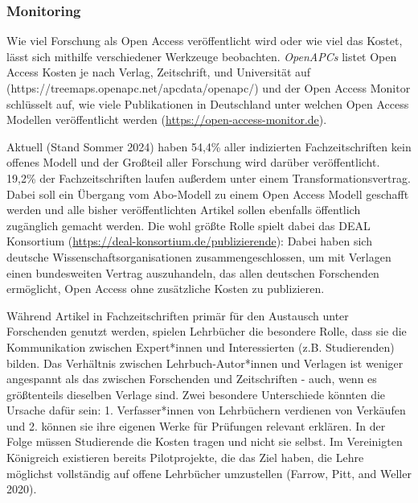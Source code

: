 \documentclass[
  letterpaper,
  DIV=11,
  numbers=noendperiod]{scrreprt}
\begin{document}
\subsubsection{Monitoring}\label{monitoring}

Wie viel Forschung als Open Access veröffentlicht wird oder wie viel das
Kostet, lässt sich mithilfe verschiedener Werkzeuge beobachten.
\emph{OpenAPCs} listet Open Access Kosten je nach Verlag, Zeitschrift,
und Universität auf (https://treemaps.openapc.net/apcdata/openapc/) und
der Open Access Monitor schlüsselt auf, wie viele Publikationen in
Deutschland unter welchen Open Access Modellen veröffentlicht werden
(\url{https://open-access-monitor.de}).

Aktuell (Stand Sommer 2024) haben 54,4\% aller indizierten
Fachzeitschriften kein offenes Modell und der Großteil aller Forschung
wird darüber veröffentlicht. 19,2\% der Fachzeitschriften laufen
außerdem unter einem Transformationsvertrag. Dabei soll ein Übergang vom
Abo-Modell zu einem Open Access Modell geschafft werden und alle bisher
veröffentlichten Artikel sollen ebenfalls öffentlich zugänglich gemacht
werden. Die wohl größte Rolle spielt dabei das DEAL Konsortium
(\url{https://deal-konsortium.de/publizierende}): Dabei haben sich
deutsche Wissenschaftsorganisationen zusammengeschlossen, um mit
Verlagen einen bundesweiten Vertrag auszuhandeln, das allen deutschen
Forschenden ermöglicht, Open Access ohne zusätzliche Kosten zu
publizieren.

\begin{tcolorbox}[enhanced jigsaw, left=2mm, colback=white, colframe=quarto-callout-note-color-frame, opacitybacktitle=0.6, opacityback=0, title=\textcolor{quarto-callout-note-color}{\faInfo}\hspace{0.5em}{Offene Lehrbücher}, toptitle=1mm, coltitle=black, colbacktitle=quarto-callout-note-color!10!white, titlerule=0mm, bottomtitle=1mm, leftrule=.75mm, breakable, rightrule=.15mm, bottomrule=.15mm, toprule=.15mm, arc=.35mm]

Während Artikel in Fachzeitschriften primär für den Austausch unter
Forschenden genutzt werden, spielen Lehrbücher die besondere Rolle, dass
sie die Kommunikation zwischen Expert*innen und Interessierten (z.B.
Studierenden) bilden. Das Verhältnis zwischen Lehrbuch-Autor*innen und
Verlagen ist weniger angespannt als das zwischen Forschenden und
Zeitschriften - auch, wenn es größtenteils dieselben Verlage sind. Zwei
besondere Unterschiede könnten die Ursache dafür sein: 1.
Verfasser*innen von Lehrbüchern verdienen von Verkäufen und 2. können
sie ihre eigenen Werke für Prüfungen relevant erklären. In der Folge
müssen Studierende die Kosten tragen und nicht sie selbst. Im
Vereinigten Königreich existieren bereits Pilotprojekte, die das Ziel
haben, die Lehre möglichst vollständig auf offene Lehrbücher umzustellen
(Farrow, Pitt, and Weller 2020).

\end{tcolorbox}
\end{document}
